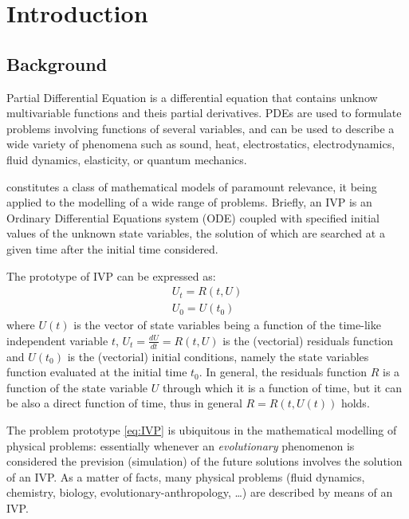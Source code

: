 \section{Introduction}\label{sec:introduction}
\subsection{Background}

Partial Differential Equation is a differential equation that contains unknow multivariable functions and theis partial derivatives. PDEs are used to formulate problems involving functions of several variables, and can be used to describe a wide variety of phenomena such as sound, heat, electrostatics, electrodynamics, fluid dynamics, elasticity, or quantum mechanics.

constitutes a class of mathematical models of paramount relevance, it being applied to the modelling of a wide range of problems. Briefly, an IVP is an Ordinary Differential Equations system (ODE) coupled with specified initial values of the unknown state variables, the solution of which are searched at a given time after the initial time considered.

The prototype of IVP can be expressed as:
\begin{equation}
  \begin{matrix}
  U_t = R(t,U) \\
  U_0 = U(t_0)
  \end{matrix}
\label{eq:IVP}
\end{equation}
where $U(t)$ is the vector of state variables being a function of the time-like independent variable $t$, $U_t = \frac{dU}{dt} = R(t,U)$ is the (vectorial) residuals function and $U(t_0)$ is the (vectorial) initial conditions, namely the state variables function evaluated at the initial time $t_0$. In general, the residuals function $R$ is a function of the state variable $U$ through which it is a function of time, but it can be also a direct function of time, thus in general $R=R(t,U(t))$ holds.

The problem prototype \ref{eq:IVP} is ubiquitous in the mathematical modelling of physical problems: essentially whenever an \emph{evolutionary} phenomenon is considered the prevision (simulation) of the future solutions involves the solution of an IVP. As a matter of facts, many physical problems (fluid dynamics, chemistry, biology, evolutionary-anthropology, \dots) are described by means of an IVP.

